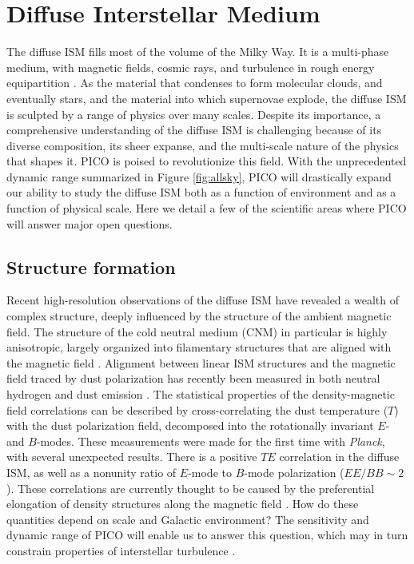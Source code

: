 \documentclass[PICOReport.tex]{subfiles}
\begin{document}
\section{Diffuse Interstellar Medium}
The diffuse ISM fills most of the volume of the Milky Way. It is a multi-phase medium, with magnetic fields, cosmic rays, and turbulence in rough energy equipartition \citep[e.g.,][]{Heiles:2005}. As the material that condenses to form molecular clouds, and eventually stars, and the material into which supernovae explode, the diffuse ISM is sculpted by a range of physics over many scales. Despite its importance, a comprehensive understanding of the diffuse ISM is challenging because of its diverse composition, its sheer expanse, and the multi-scale nature of the physics that shapes it. PICO is poised to revolutionize this field. With the unprecedented dynamic range summarized in Figure \ref{fig:allsky}, PICO will drastically expand our ability to study the diffuse ISM both as a function of environment and as a function of physical scale. Here we detail a few of the scientific areas where PICO will answer major open questions.

\subsection{Structure formation}
Recent high-resolution observations of the diffuse ISM have revealed a wealth of complex structure, deeply influenced by the structure of the ambient magnetic field. The structure of the cold neutral medium (CNM) in particular is highly anisotropic, largely organized into filamentary structures that are aligned with the magnetic field \citep{Clark:2014}. Alignment between linear ISM structures and the magnetic field traced by dust polarization has recently been measured in both neutral hydrogen \citep{Clark:2015, Kalberla:2016} and dust emission \citep{Planck:XXXII}. The statistical properties of the density-magnetic field correlations can be described by cross-correlating the dust temperature ($T$) with the dust polarization field, decomposed into the rotationally invariant $E$- and $B$-modes. These measurements were made for the first time with \textit{Planck}, with several unexpected results. There is a positive $TE$ correlation in the diffuse ISM, as well as a nonunity ratio of $E$-mode to $B$-mode polarization ($EE/BB \sim 2$). These correlations are currently thought to be caused by the preferential elongation of density structures along the magnetic field \citep{Clark:2015, Planck:XXXVIII}. 
How do these quantities depend on scale and Galactic environment? The sensitivity and dynamic range of PICO will enable us to answer this question, which may in turn constrain properties of interstellar turbulence \citep[e.g.,][]{Caldwell:2017, Kandel:2017}. 
\end{document}
